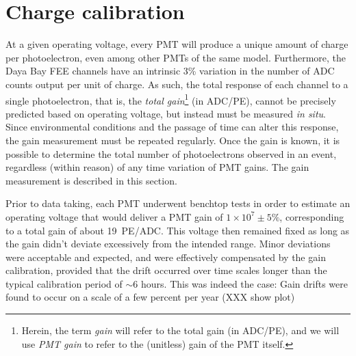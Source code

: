 \documentclass[../thesis.tex]{subfiles}
\begin{document}
\section{Charge calibration}
\label{sec:calibGain}

At a given operating voltage, every PMT will produce a unique amount of charge
per photoelectron, even among other PMTs of the same model. Furthermore, the
Daya Bay FEE channels have an intrinsic 3\% variation in the number of ADC
counts output per unit of charge. As such, the total response of each channel to
a single photoelectron, that is, the \emph{total gain}\footnote{Herein, the term
  \emph{gain} will refer to the total gain (in ADC/PE), and we will use
  \emph{PMT gain} to refer to the (unitless) gain of the PMT itself.} (in
ADC/PE), cannot be precisely predicted based on operating voltage, but instead
must be measured \emph{in situ}. Since environmental conditions and the passage
of time can alter this response, the gain measurement must be repeated
regularly. Once the gain is known, it is possible to determine the total number
of photoelectrons observed in an event, regardless (within reason) of any time
variation of PMT gains. The gain measurement is described in this section.

Prior to data taking, each PMT underwent benchtop tests in order to estimate an
operating voltage that would deliver a PMT gain of $1 \times 10^7 \pm 5\%$,
corresponding to a total gain of about 19~PE/ADC. This voltage then remained
fixed as long as the gain didn't deviate excessively from the intended
range. Minor deviations were acceptable and expected, and were effectively
compensated by the gain calibration, provided that the drift occurred over time
scales longer than the typical calibration period of $\sim$6 hours. This was
indeed the case: Gain drifts were found to occur on a scale of a few percent per
year (XXX show plot)
\end{document}
